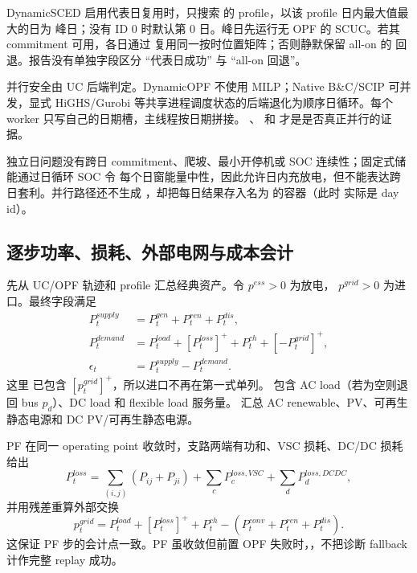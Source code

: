 DynamicSCED 启用代表日复用时，只搜索  的 profile，以该 profile 日内最大值最大的日为
峰日；没有 ID 0 时默认第 0 日。峰日先运行无 OPF 的 SCUC。若其 commitment 可用，各日通过
 复用同一按时位置矩阵；否则静默保留 all-on 的
 回退。报告没有单独字段区分 ``代表日成功'' 与 ``all-on 回退''。

并行安全由 UC 后端判定。DynamicOPF 不使用 MILP；Native B\&C/SCIP 可并发，显式 HiGHS/Gurobi
等共享进程调度状态的后端退化为顺序日循环。每个 worker 只写自己的日期槽，主线程按日期拼接。
、 和
 才是是否真正并行的证据。

独立日问题没有跨日 commitment、爬坡、最小开停机或 SOC 连续性；固定式储能通过日循环 SOC 令
每个日窗能量中性，因此允许日内充放电，但不能表达跨日套利。并行路径还不生成 ，却把每日结果存入名为
 的容器（此时  实际是 day id）。

\subsection{逐步功率、损耗、外部电网与成本会计}
 先从 UC/OPF 轨迹和 profile 汇总经典资产。令 $p^{ess}>0$ 为放电，
$p^{grid}>0$ 为进口。最终字段满足
\begin{align}
 P_t^{supply}&=P_t^{gen}+P_t^{ren}+P_t^{dis},\\
 P_t^{demand}&=P_t^{load}+[P_t^{loss}]^++P_t^{ch}+[-P_t^{grid}]^+,\\
 \epsilon_t&=P_t^{supply}-P_t^{demand}.
\end{align}
这里  已包含 $[p_t^{grid}]^+$，所以进口不再在第一式单列。
 包含 AC load（若为空则退回 bus $p_d$）、DC load 和 flexible load 服务量。
 汇总 AC renewable、PV、可再生静态电源和 DC PV/可再生静态电源。

PF 在同一 operating point 收敛时，支路两端有功和、VSC 损耗、DC/DC 损耗给出
\begin{equation}
 P_t^{loss}=\sum_{(i,j)}(P_{ij}+P_{ji})+\sum_c P_c^{loss,VSC}
 +\sum_d P_d^{loss,DCDC},
\end{equation}
并用残差重算外部交换
\begin{equation}
 p_t^{grid}=P_t^{load}+[P_t^{loss}]^++P_t^{ch}
 -(P_t^{conv}+P_t^{ren}+P_t^{dis}).
\end{equation}
这保证 PF 步的会计点一致。PF 虽收敛但前置 OPF 失败时，，不把诊断
fallback 计作完整 replay 成功。

